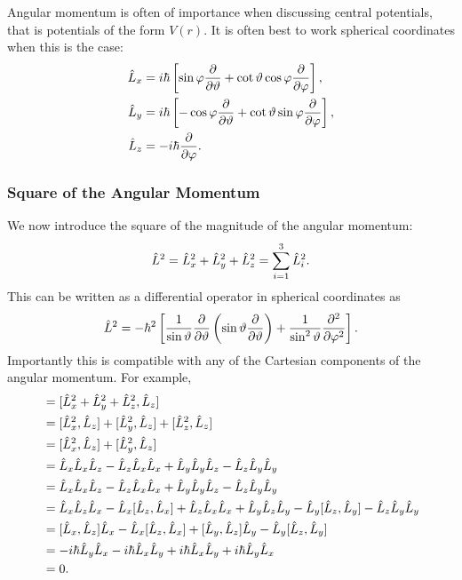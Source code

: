 Angular momentum is often of importance when discussing central potentials, that is potentials of the form \(V(r)\).
It is often best to work spherical coordinates when this is the case:
\begin{align*}
    \hat{L}_x &= i\hbar\left[\sin\varphi \pdv{\vartheta} + \cot\vartheta \cos\varphi \pdv{\varphi}\right],\\
    \hat{L}_y &= i\hbar\left[-\cos\varphi \pdv{\vartheta} + \cot\vartheta \sin\varphi \pdv{\varphi}\right],\\
    \hat{L}_z &= -i\hbar\pdv{\varphi}.
\end{align*}

\subsubsection{Square of the Angular Momentum}
We now introduce the square of the magnitude of the angular momentum:
\[\hat{L}^2 = \hat{L}_x^2 + \hat{L}_y^2 + \hat{L}_z^2 = \sum_{i=1}^{3} \hat{L}_i^2.\]
This can be written as a differential operator in spherical coordinates as
\begin{equation}\label{eqn:L^2 in spherical coord}
    \hat{L}^2 = -\hbar^2 \left[\frac{1}{\sin\vartheta}\pdv{\vartheta}\left(\sin\vartheta \pdv{\vartheta}\right) + \frac{1}{\sin^2\vartheta}\pdv[2]{\varphi}\right].
\end{equation}
Importantly this is compatible with any of the Cartesian components of the angular momentum.
For example,
\begin{align*}
    [\operator{L}^2, \operator{L}_z] &= [\operator{L}_x^2 + \operator{L}_y^2 + \operator{L}_z^2, \operator{L}_z]\\
    &= [\operator{L}_x^2, \operator{L}_z] + [\operator{L}_y^2, \operator{L}_z] + [\operator{L}_z^2, \operator{L}_z]\\
    &= [\operator{L}_x^2, \operator{L}_z] + [\operator{L}_y^2, \operator{L}_z]\\
    &= \operator{L}_x\operator{L}_x\operator{L}_z - \operator{L}_z\operator{L}_x\operator{L}_x + \operator{L}_y\operator{L}_y\operator{L}_z - \operator{L}_z\operator{L}_y\operator{L}_y\\
    &= \operator{L}_x\operator{L}_x\operator{L}_z - \operator{L}_z\operator{L}_x\operator{L}_x + \operator{L}_y\operator{L}_y\operator{L}_z - \operator{L}_z\operator{L}_y\operator{L}_y\\
    &= \operator{L}_x\operator{L}_z\operator{L}_x - \operator{L}_x[\operator{L}_z, \operator{L}_x] + \operator{L}_z\operator{L}_x\operator{L}_x + \operator{L}_y\operator{L}_z\operator{L}_y - \operator{L}_y[\operator{L}_z, \operator{L}_y] - \operator{L}_z\operator{L}_y\operator{L}_y\\
    &= [\operator{L}_x, \operator{L}_z]\operator{L}_x - \operator{L}_x[\operator{L}_z, \operator{L}_x] + [\operator{L}_y, \operator{L}_z]\operator{L}_y - \operator{L}_y[\operator{L}_z, \operator{L}_y]\\
    &= -i\hbar\operator{L}_y\operator{L}_x - i\hbar\operator{L}_x\operator{L}_y + i\hbar\operator{L}_x\operator{L}_y + i\hbar\operator{L}_y\operator{L}_x\\
    &= 0.
\end{align*}
